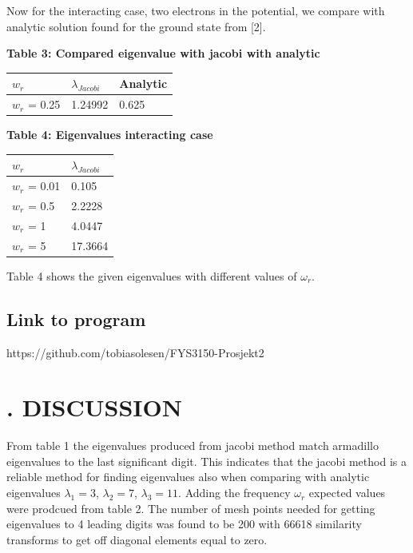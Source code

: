 \documentclass[twocolumn]{article}
\begin{document}
Now for the interacting case, two electrons in the potential, we compare with analytic solution found for the ground state from [2].
\newline
\bigskip

\textbf{Table 3: Compared eigenvalue with jacobi with analytic}
\newline
\resizebox{3cm} {
\begin{tabular}{|| l | l | l||}
    \hline
    $w_r$ & $\lambda_{Jacobi}$ & Analytic \\
    \hline 
    $w_r$ = 0.25 & 1.24992 & 0.625 \\
    \hline
\end{tabular}
}
\bigskip

\textbf{Table 4: Eigenvalues interacting case}
\newline
\resizebox{3cm} {
\begin{tabular}{|| l | l||}
    \hline
    $w_r$ & $\lambda_{Jacobi}$\\
    \hline 
    $w_r$ = 0.01 &  0.105\\
    \hline
    $w_r$ = 0.5 &  2.2228\\
    \hline
    $w_r$ = 1 &  4.0447\\
    \hline
    $w_r$ = 5 & 17.3664 \\
    \hline
\end{tabular}
}
\bigskip
\newline

Table 4 shows the given eigenvalues with different values of $\omega_r$. 

\subsection*{Link to program}
https://github.com/tobiasolesen/FYS3150-Prosjekt2

\section*{. DISCUSSION}
From table 1 the eigenvalues produced from jacobi method match armadillo eigenvalues to the last significant digit. This indicates that the jacobi method is a reliable method for finding eigenvalues also when comparing with analytic eigenvalues $\lambda_1 = 3$, $\lambda_2 = 7$, $\lambda_3 =11$. 
Adding the frequency $\omega_r$ expected values were prodcued from table 2. The number of mesh points needed for getting eigenvalues to 4 leading digits was found to be 200 with 66618 similarity transforms to get off diagonal elements equal to zero.
\end{document}
